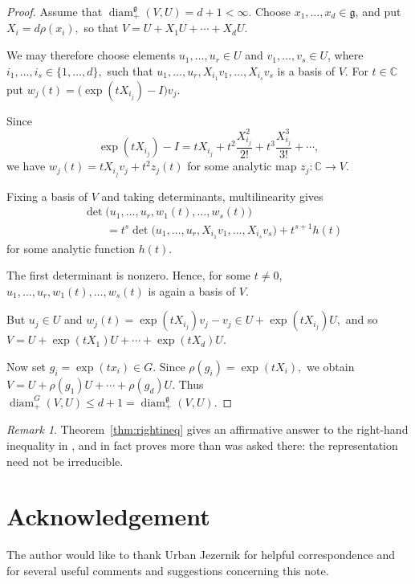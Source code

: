 \documentclass[11pt]{article}
\theoremstyle{remark}
\newtheorem{remark}[theorem]{Remark}
\newcommand{\C}{\mathbb C}
\begin{document}
\begin{proof}
Assume that $\operatorname{diam}^{\mathfrak g}_{+}(V,U)=d+1<\infty.$
Choose $x_1,\ldots,x_d\in\mathfrak g$, and put $X_i=d\rho(x_i),$
so that $V=U+X_1U+\cdots+X_dU.$

We may therefore choose elements $u_1,\ldots,u_r\in U$
and $v_1,\ldots,v_s\in U$, where $i_1,\ldots,i_s\in\{1,\ldots,d\},$
such that $u_1,\ldots,u_r,
 X_{i_1}v_1,\ldots,X_{i_s}v_s$
is a basis of $V$. For $t\in\C$ put $w_j(t)
 =
 \bigl(\operatorname{exp}(tX_{i_j})-I\bigr)v_j.$
 
Since
\[
 \operatorname{exp}(tX_{i_j})-I
 =
 tX_{i_j}+t^2\frac{X_{i_j}^2}{2!}
 +t^3\frac{X_{i_j}^3}{3!}+\cdots,
\]
we have $w_j(t)
 =
 tX_{i_j}v_j+t^2z_j(t)$
for some analytic map $z_j:\mathbb C\to V$.

Fixing a basis of $V$ and taking determinants, multilinearity gives
\[
\begin{aligned}
 &\det\bigl(
 u_1,\ldots,u_r,
 w_1(t),\ldots,w_s(t)
 \bigr)
\\
 &\qquad =
 t^s
 \det\bigl(
 u_1,\ldots,u_r,
 X_{i_1}v_1,\ldots,X_{i_s}v_s
 \bigr)
 +t^{s+1}h(t)
\end{aligned}
\]
for some analytic function $h(t)$.

The first determinant is nonzero. Hence, for some $t\neq0$, $u_1,\ldots,u_r,
 w_1(t),\ldots,w_s(t)$
is again a basis of $V$.

But $u_j\in U$ and $w_j(t)
 =
 \operatorname{exp}(tX_{i_j})v_j-v_j
 \in
 U+\operatorname{exp}(tX_{i_j})U,$ and so $V
 =
 U+\operatorname{exp}(tX_1)U+\cdots+
 \operatorname{exp}(tX_d)U.$

Now set $g_i=\operatorname{exp}(tx_i)\in G.$
Since $\rho(g_i)=\operatorname{exp}(tX_i),$ we obtain $V
 =
 U+\rho(g_1)U+\cdots+\rho(g_d)U.$
Thus $\operatorname{diam}^{G}_{+}(V,U)
 \leq d+1
 =
 \operatorname{diam}^{\mathfrak g}_{+}(V,U).$
\end{proof}
\begin{remark}
Theorem~\ref{thm:rightineq} gives an affirmative answer to the right-hand
inequality in \cite[Question~6.7]{JezernikSpenko}, and in fact proves more
than was asked there: the representation need not be irreducible.
\end{remark}


\section*{Acknowledgement}
The author would like to thank Urban Jezernik for helpful correspondence and for several useful comments and suggestions concerning this note.
\end{document}
